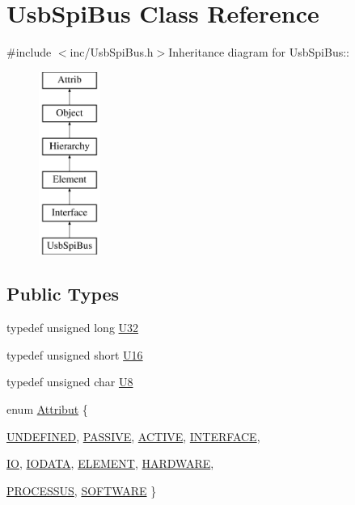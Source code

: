 \hypertarget{classUsbSpiBus}{
\section{UsbSpiBus Class Reference}
\label{classUsbSpiBus}
}


{\ttfamily \#include $<$inc/UsbSpiBus.h$>$}Inheritance diagram for UsbSpiBus::\begin{figure}[H]
\begin{center}
\leavevmode
\includegraphics[height=6cm]{classUsbSpiBus}
\end{center}
\end{figure}
\subsection*{Public Types}
\begin{DoxyCompactItemize}
\item 
typedef unsigned long \hyperlink{classUsbSpiBus_a9b24e28662a35ca57f5ed32c41c5f3ff}{U32}
\item 
typedef unsigned short \hyperlink{classUsbSpiBus_a741e3c698b080973693ceb990017a560}{U16}
\item 
typedef unsigned char \hyperlink{classUsbSpiBus_a11336f4ad104fbd4fb454be044f19fc8}{U8}
\item 
enum \hyperlink{classAttrib_a69e171d7cc6417835a5a306d3c764235}{Attribut} \{ \par
\hyperlink{classAttrib_a69e171d7cc6417835a5a306d3c764235a3a8da2ab97dda18aebab196fe4100531}{UNDEFINED}, 
\hyperlink{classAttrib_a69e171d7cc6417835a5a306d3c764235a2bfb2af57b87031d190a05fe25dd92ed}{PASSIVE}, 
\hyperlink{classAttrib_a69e171d7cc6417835a5a306d3c764235a3b1fec929c0370d1436f2f06e298fb0d}{ACTIVE}, 
\hyperlink{classAttrib_a69e171d7cc6417835a5a306d3c764235aa27c16b480a369ea4d18b07b2516bbc7}{INTERFACE}, 
\par
\hyperlink{classAttrib_a69e171d7cc6417835a5a306d3c764235a1420a5b8c0540b2af210b6975eded7f9}{IO}, 
\hyperlink{classAttrib_a69e171d7cc6417835a5a306d3c764235a0af3b0d0ac323c1704e6c69cf90add28}{IODATA}, 
\hyperlink{classAttrib_a69e171d7cc6417835a5a306d3c764235a7788bc5dd333fd8ce18562b269c9dab1}{ELEMENT}, 
\hyperlink{classAttrib_a69e171d7cc6417835a5a306d3c764235a61ceb22149f365f1780d18f9d1459423}{HARDWARE}, 
\par
\hyperlink{classAttrib_a69e171d7cc6417835a5a306d3c764235a75250e29692496e73effca2c0330977f}{PROCESSUS}, 
\hyperlink{classAttrib_a69e171d7cc6417835a5a306d3c764235a103a67cd0b8f07ef478fa45d4356e27b}{SOFTWARE}
 \}
\end{DoxyCompactItemize}
